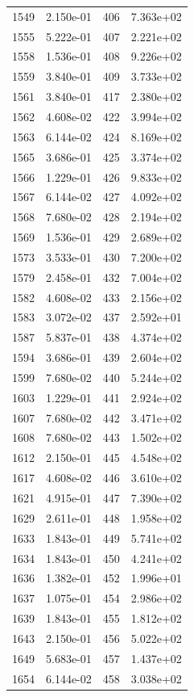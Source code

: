 \documentclass[12pt]{article}
\begin{document}
\begin{longtable}{@{}cccc@{}}
1549 & 2.150e-01 & 406 & 7.363e+02 \\
1555 & 5.222e-01 & 407 & 2.221e+02 \\
1558 & 1.536e-01 & 408 & 9.226e+02 \\
1559 & 3.840e-01 & 409 & 3.733e+02 \\
1561 & 3.840e-01 & 417 & 2.380e+02 \\
1562 & 4.608e-02 & 422 & 3.994e+02 \\
1563 & 6.144e-02 & 424 & 8.169e+02 \\
1565 & 3.686e-01 & 425 & 3.374e+02 \\
1566 & 1.229e-01 & 426 & 9.833e+02 \\
1567 & 6.144e-02 & 427 & 4.092e+02 \\
1568 & 7.680e-02 & 428 & 2.194e+02 \\
1569 & 1.536e-01 & 429 & 2.689e+02 \\
1573 & 3.533e-01 & 430 & 7.200e+02 \\
1579 & 2.458e-01 & 432 & 7.004e+02 \\
1582 & 4.608e-02 & 433 & 2.156e+02 \\
1583 & 3.072e-02 & 437 & 2.592e+01 \\
1587 & 5.837e-01 & 438 & 4.374e+02 \\
1594 & 3.686e-01 & 439 & 2.604e+02 \\
1599 & 7.680e-02 & 440 & 5.244e+02 \\
1603 & 1.229e-01 & 441 & 2.924e+02 \\
1607 & 7.680e-02 & 442 & 3.471e+02 \\
1608 & 7.680e-02 & 443 & 1.502e+02 \\
1612 & 2.150e-01 & 445 & 4.548e+02 \\
1617 & 4.608e-02 & 446 & 3.610e+02 \\
1621 & 4.915e-01 & 447 & 7.390e+02 \\
1629 & 2.611e-01 & 448 & 1.958e+02 \\
1633 & 1.843e-01 & 449 & 5.741e+02 \\
1634 & 1.843e-01 & 450 & 4.241e+02 \\
1636 & 1.382e-01 & 452 & 1.996e+01 \\
1637 & 1.075e-01 & 454 & 2.986e+02 \\
1639 & 1.843e-01 & 455 & 1.812e+02 \\
1643 & 2.150e-01 & 456 & 5.022e+02 \\
1649 & 5.683e-01 & 457 & 1.437e+02 \\
1654 & 6.144e-02 & 458 & 3.038e+02 \\

\end{longtable}
\end{document}
